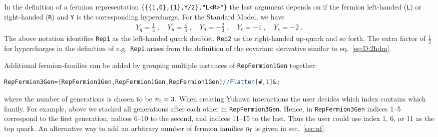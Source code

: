 \documentclass[11pt]{article}
\newcommand{\nf}{n_{\rm f}}
\newcommand{\Yl}{Y_{\ell}}
\newcommand{\Yq}{Y_{q}}
\newcommand{\Ye}{Y_{e}}
\newcommand{\Yu}{Y_{u}}
\newcommand{\Yd}{Y_{d}}
\begin{document}
In the definition of a fermion representation
{\verb!{{{1,0},{1},Y/2},"L<R>"}!}
the last argument depends on if the fermion 
left-handed ({\tt L}) or
right-handed ({\tt R}) and
{\tt Y} is the corresponding hypercharge.
For the Standard Model, we have
\begin{align}
\label{eq:hypercharge}
  \Yq = \frac{1}{3}\;,\quad
  \Yu = \frac{4}{3}\;,\quad
  \Yd = -\frac{2}{3}\;,\quad
  \Yl = -1\;,\quad
  \Ye = -2
  \;.
\end{align}
The above notation identifies
{\tt Rep1} as the left-handed quark doublet,
{\tt Rep2} as the right-handed up-quark and so forth.
The extra factor of $\frac{1}{2}$ for hypercharges in the definition of
e.g.\ {\tt Rep1}
arises from the definition of the covariant derivative similar to eq.~\eqref{eq:D:2hdm}.


Additional fermion-families can be added by grouping multiple instances of
{\tt RepFermion1Gen} together:
\begin{lstlisting}[language=Mathematica,mathescape=true]
RepFermion3Gen={RepFermion1Gen,RepFermion1Gen,RepFermion1Gen}//Flatten[#,1]&;
\end{lstlisting}
where the number of generations is chosen to be $\nf = 3$.
When creating Yukawa interactions the user decides which index contains which family.
For example, above we stacked all generations after each other in {\tt RepFermion3Gen}.
Hence,
in {\tt RepFermion3Gen}
indices 1--5 correspond to the first generation,
indices 6--10 to the second, and
indices 11--15 to the last. 
Thus the user could use index
1, 6, or 11 as the top quark. 
An alternative way to add an arbitrary number of fermion families
$\nf$ is given
in sec.~\ref{sec:nf}.
\end{document}
